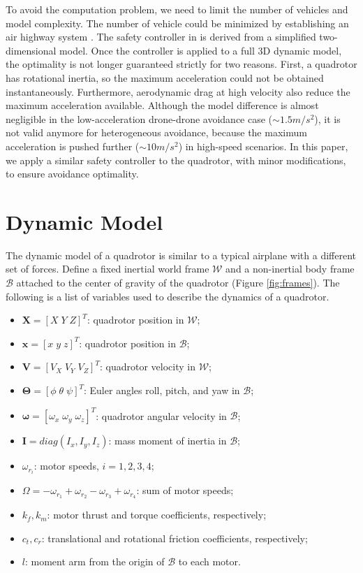 \documentclass[journal,11pt,onecolumn,draftclsnofoot,]{IEEEtran}
\begin{document}
To avoid the computation problem, we need to limit the number of vehicles and model complexity. The number of vehicle could be minimized by establishing an air highway system \cite{chen2015safe}. The safety controller in \cite{hoffmann2008decentralized} is derived from a simplified two-dimensional model. Once the controller is applied to a full 3D dynamic model, the optimality is not longer guaranteed strictly for two reasons. First, a quadrotor has rotational inertia, so the maximum acceleration could not be obtained instantaneously. Furthermore, aerodynamic drag at high velocity also reduce the maximum acceleration available. Although the model difference is almost negligible in the low-acceleration drone-drone avoidance case ($\sim 1.5m/s^2$), it is not valid anymore for heterogeneous avoidance, because the maximum acceleration is pushed further  ($\sim 10m/s^2$) in high-speed scenarios. In this paper, we apply a similar safety controller to the quadrotor, with minor modifications, to ensure avoidance optimality.

\section{\textbf{Dynamic Model}} \label{sec:dynamic_model}

The dynamic model of a quadrotor is similar to a typical airplane with a different set of forces. Define a fixed inertial world frame $\mathcal{W}$ and a non-inertial body frame $\mathcal{B}$ attached to the center of gravity of the quadrotor (Figure \ref{fig:frames}). The following is a list of variables used to describe the dynamics of a quadrotor.

\begin{itemize}
\item $\boldsymbol{X}=[X\; Y\; Z]^T$: quadrotor position in $\mathcal{W}$;
\item $\boldsymbol{x}=[x\; y\; z]^T$: quadrotor position in $\mathcal{B}$;
\item $\boldsymbol{V}=[V_X\; V_Y\; V_Z]^T$: quadrotor velocity in $\mathcal{W}$;
\item $\boldsymbol{\Theta}=[\phi\; \theta\; \psi]^T$: Euler angles roll, pitch, and yaw in $\mathcal{B}$;
\item $\boldsymbol{\omega}=[\omega _x\; \omega _y\; \omega _z]^T$: quadrotor angular velocity in $\mathcal{B}$;
\item $\boldsymbol{I}=diag(I_x,I_y,I_z)$: mass moment of inertia in $\mathcal{B}$;
\item $\omega _{r_i}$: motor speeds, $i=1,2,3,4$;
\item $\Omega=-\omega _{r_1}+\omega _{r_2}-\omega _{r_3}+\omega _{r_4}$: sum of motor speeds;
\item $k_f, k_m$: motor thrust and torque coefficients, respectively;
\item $c_t, c_r$: translational and rotational friction coefficients, respectively;
\item $l$: moment arm from the origin of $\mathcal{B}$ to each motor.
\end{itemize}
\end{document}
